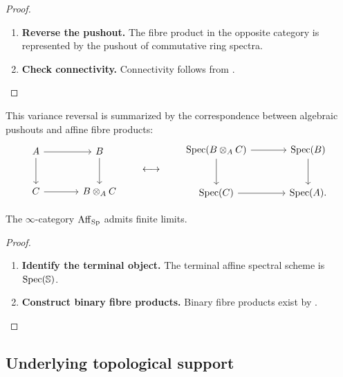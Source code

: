 \begin{proof}
\leavevmode
\begin{enumerate}[label=\textup{(\arabic*)}]
    \item \textbf{Reverse the pushout.}
    The fibre product in the opposite category is represented by the pushout
    of commutative ring spectra.

    \item \textbf{Check connectivity.}
    Connectivity follows from
    .
\end{enumerate}
\end{proof}

This variance reversal is summarized by the correspondence between algebraic
pushouts and affine fibre products:
\[
\begin{tikzcd}[column sep=large, row sep=large]
    A \arrow[r] \arrow[d] & B \arrow[d] \\
    C \arrow[r] & B\otimes_AC
\end{tikzcd}
\qquad\longleftrightarrow\qquad
\begin{tikzcd}[column sep=large, row sep=large]
    \Spec(B\otimes_AC) \arrow[r] \arrow[d]
        & \Spec(B) \arrow[d] \\
    \Spec(C) \arrow[r] & \Spec(A).
\end{tikzcd}
\]

\begin{corollary}
\label{cor:affine-spectral-finite-limits}
The $\infty$-category $\operatorname{Aff}_{\operatorname{Sp}}$ admits finite limits.
\end{corollary}

\begin{proof}
\leavevmode
\begin{enumerate}[label=\textup{(\arabic*)}]
    \item \textbf{Identify the terminal object.}
    The terminal affine spectral scheme is $\operatorname{Spec}(\mathbb S)$.

    \item \textbf{Construct binary fibre products.}
    Binary
    fibre products exist by .
\end{enumerate}
\end{proof}

\subsection{Underlying topological support}

